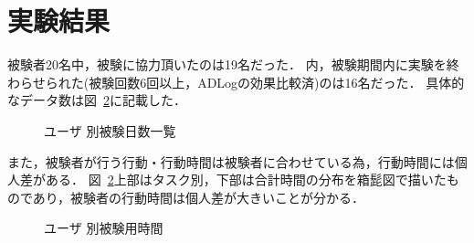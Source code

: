 \section{実験結果}
被験者20名中，被験に協力頂いたのは19名だった．
内，被験期間内に実験を終わらせられた(被験回数6回以上，ADLogの効果比較済)のは16名だった．
具体的なデータ数は図~\ref{fig:day}に記載した．
\begin{figure}[hb]
	\begin{center}
		\caption{ユーザ 別被験日数一覧}
		\label{fig:day}
	\end{center}
\end{figure}

また，被験者が行う行動・行動時間は被験者に合わせている為，行動時間には個人差がある．
図~\ref{fig:day}上部はタスク別，下部は合計時間の分布を箱髭図で描いたものであり，被験者の行動時間は個人差が大きいことが分かる．
\begin{figure}[hb]
	\begin{center}
		\caption{ユーザ 別被験用時間}
		\label{fig:day}
	\end{center}
\end{figure}


